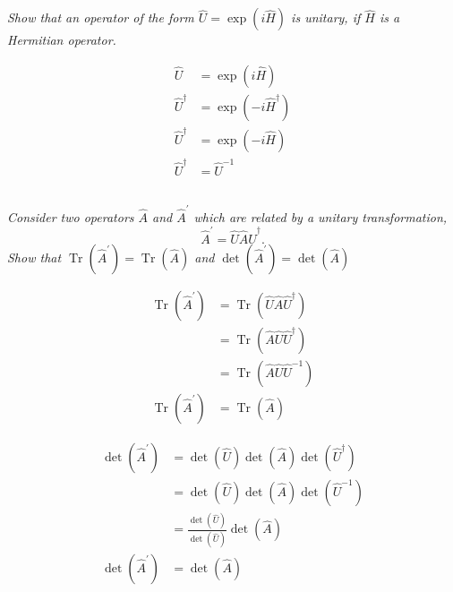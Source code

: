 \documentclass{article}
\begin{document}
\subsection{}
\textit{Show that an operator of the form $\hat{U}=\exp (i \hat{H})$ is unitary, if $\hat{H}$ is a Hermitian operator.}


\begin{align*}
    \hat{U} &=\exp (i \hat{H}) \\
    \hat{U}^\dagger &=\exp (-i \hat{H}^\dagger) \\
    \hat{U}^\dagger &=\exp (-i \hat{H}) \\
    \hat{U}^\dagger &=\hat{U}^{-1}
\end{align*}

\subsection{}
\textit{Consider two operators $\hat{A}$ and $\hat{A}^{\prime}$ which are related by a unitary transformation,} 
$$
\hat{A}^{\prime}=\hat{U} \hat{A} \hat{U}^{\dagger}.
$$
\textit{Show that $\operatorname{Tr}\left(\hat{A}^{\prime}\right)=\operatorname{Tr}(\hat{A})$ and $\operatorname{det}\left(\hat{A}^{\prime}\right)=\operatorname{det}(\hat{A})$}

\begin{align*}
    \operatorname{Tr}\left(\hat{A}^{\prime}\right)&=\operatorname{Tr}\left(\hat{U}\hat{A}\hat{U}^\dagger\right)\\
    &=\operatorname{Tr}\left(\hat{A}\hat{U}\hat{U}^\dagger\right)\\
    &=\operatorname{Tr}\left(\hat{A}\hat{U}\hat{U}^{-1}\right)\\
    \operatorname{Tr}\left(\hat{A}^{\prime}\right)&=\operatorname{Tr}\left(\hat{A}\right)
\end{align*}

\begin{align*}
    \operatorname{det}(\hat{A}^\prime) &= \operatorname{det}(\hat{U})\operatorname{det}(\hat{A})\operatorname{det}(\hat{U}^\dagger)\\
    &= \operatorname{det}(\hat{U})\operatorname{det}(\hat{A})\operatorname{det}(\hat{U}^{-1})\\
    &= \frac{\operatorname{det}(\hat{U})}{\operatorname{det}(\hat{U})}\operatorname{det}(\hat{A})\\
    \operatorname{det}\left(\hat{A}^{\prime}\right)&=\operatorname{det}\left(\hat{A}\right)
\end{align*}
\end{document}
